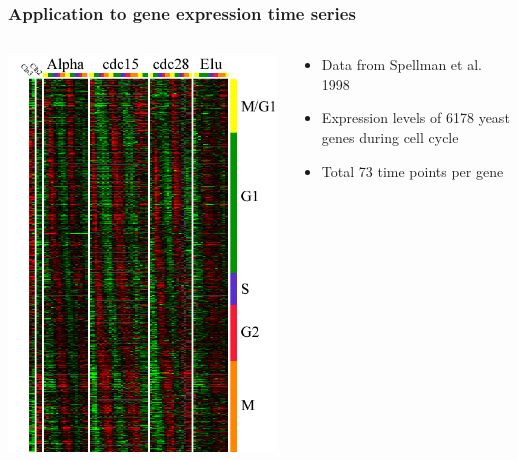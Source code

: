 \documentclass{beamer}
\begin{document}
\begin{frame}
\frametitle{Application to gene expression time series}
\begin{columns}
\begin{column}{0.4\textwidth}
\includegraphics[scale = 0.27]{yeast_cc_fig1.jpg}
\end{column}
\begin{column}{0.6\textwidth}

\begin{itemize}
\item Data from Spellman et al. 1998
\item Expression levels of 6178 yeast genes during cell cycle
\item Total 73 time points per gene
\end{itemize}
\end{column}
\end{columns}
\end{frame}
\end{document}
